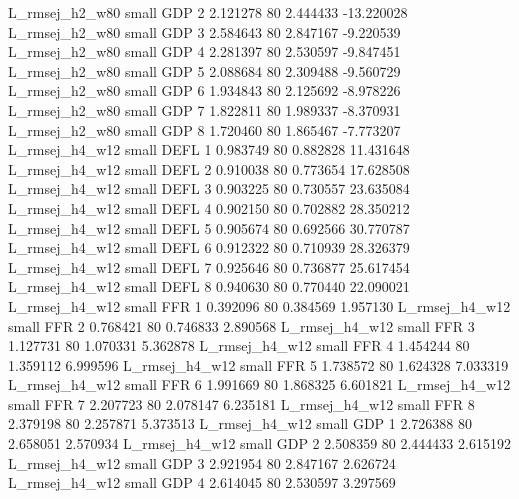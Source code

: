 L_rmsej_h2_w80      small      GDP                 2 2.121278 80       2.444433         -13.220028
L_rmsej_h2_w80      small      GDP                 3 2.584643 80       2.847167          -9.220539
L_rmsej_h2_w80      small      GDP                 4 2.281397 80       2.530597          -9.847451
L_rmsej_h2_w80      small      GDP                 5 2.088684 80       2.309488          -9.560729
L_rmsej_h2_w80      small      GDP                 6 1.934843 80       2.125692          -8.978226
L_rmsej_h2_w80      small      GDP                 7 1.822811 80       1.989337          -8.370931
L_rmsej_h2_w80      small      GDP                 8 1.720460 80       1.865467          -7.773207
L_rmsej_h4_w12      small     DEFL                 1 0.983749 80       0.882828          11.431648
L_rmsej_h4_w12      small     DEFL                 2 0.910038 80       0.773654          17.628508
L_rmsej_h4_w12      small     DEFL                 3 0.903225 80       0.730557          23.635084
L_rmsej_h4_w12      small     DEFL                 4 0.902150 80       0.702882          28.350212
L_rmsej_h4_w12      small     DEFL                 5 0.905674 80       0.692566          30.770787
L_rmsej_h4_w12      small     DEFL                 6 0.912322 80       0.710939          28.326379
L_rmsej_h4_w12      small     DEFL                 7 0.925646 80       0.736877          25.617454
L_rmsej_h4_w12      small     DEFL                 8 0.940630 80       0.770440          22.090021
L_rmsej_h4_w12      small      FFR                 1 0.392096 80       0.384569           1.957130
L_rmsej_h4_w12      small      FFR                 2 0.768421 80       0.746833           2.890568
L_rmsej_h4_w12      small      FFR                 3 1.127731 80       1.070331           5.362878
L_rmsej_h4_w12      small      FFR                 4 1.454244 80       1.359112           6.999596
L_rmsej_h4_w12      small      FFR                 5 1.738572 80       1.624328           7.033319
L_rmsej_h4_w12      small      FFR                 6 1.991669 80       1.868325           6.601821
L_rmsej_h4_w12      small      FFR                 7 2.207723 80       2.078147           6.235181
L_rmsej_h4_w12      small      FFR                 8 2.379198 80       2.257871           5.373513
L_rmsej_h4_w12      small      GDP                 1 2.726388 80       2.658051           2.570934
L_rmsej_h4_w12      small      GDP                 2 2.508359 80       2.444433           2.615192
L_rmsej_h4_w12      small      GDP                 3 2.921954 80       2.847167           2.626724
L_rmsej_h4_w12      small      GDP                 4 2.614045 80       2.530597           3.297569
